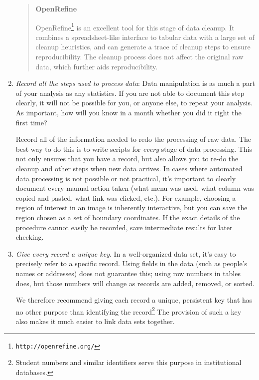 \documentclass[10pt]{article}
\newcommand{\recommend}[1]{\textit{#1}}
\newcommand{\withurl}[2]{{#1}\footnote{\texttt{#2}}}
\begin{document}
\begin{enumerate}
  \begin{quote}
    \noindent \textbf{OpenRefine}

    \withurl{OpenRefine}{http://openrefine.org/}
    is an excellent tool
    for this stage of data cleanup. It combines a spreadsheet-like
    interface to tabular data with a large set of cleanup heuristics,
    and can generate a trace of cleanup steps to ensure
    reproducibility.  The cleanup process does not affect the original
    raw data, which further aids reproducibility.
  \end{quote}

\item
  \recommend{Record all the steps used to process data}: Data manipulation is as
  much a part of your analysis as any statistics. If you are not able to
  document this step clearly, it will not be possible for you, or anyone
  else, to repeat your analysis. As important, how will you know in
  a month whether you did it
  right the first time?

  Record all of the information needed to redo the processing of raw data.
  The best way to do this is to write scripts for
  \emph{every} stage of data processing.
  This not only ensures that you have a record, but also allows you to
  re-do the cleanup and other steps when new data arrives.
  In cases where automated data processing is not possible
  or not practical, it's important to
  clearly document every manual action taken (what menu was used, what
  column was copied and pasted, what link was clicked, etc.). For example,
  choosing a region of interest in an image
  is inherently interactive, but you can save the region chosen
  as a set of boundary coordinates. If the
  exact details of the procedure cannot easily be recorded,
  save intermediate results for later checking.

\item
  \recommend{Give every record a unique key}.  In a well-organized
  data set, it's easy to precisely refer to a specific record.
  Using fields in the data (such as people's names or addresses) does
  not guarantee this; using row numbers in tables does, but those
  numbers will change as records are added, removed, or sorted.

  We therefore recommend giving each record a unique, persistent key
  that has no other purpose than identifying the
  record\footnote{Student numbers and similar identifiers serve this
    purpose in institutional databases.} The provision of such a key
  also makes it much easier to link data sets together.


\end{enumerate}
\end{document}
